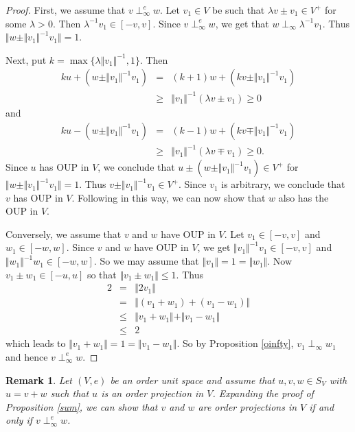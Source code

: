 \documentclass[12pt]{amsart}
\newtheorem{remark}[theorem]{Remark}
\begin{document}
\begin{proof}
	First, we assume that $v \perp_{\infty}^e w$. Let $v_1 \in V$ be such that $\lambda v \pm v_1 \in V^+$ for some $\lambda > 0$. Then $\lambda^{-1} v_1 \in [- v, v]$. Since $v \perp_{\infty}^e w$, we get that $w \perp_{\infty} \lambda^{-1} v_1$. Thus $\Vert w \pm \Vert v_1 \Vert^{-1} v_1 \Vert = 1$. 
	
	Next, put $k = \max \lbrace \lambda \Vert v_1 \Vert^{-1}, 1 \rbrace$. Then 
	\begin{eqnarray*}
		k u + (w \pm \Vert v_1 \Vert^{-1} v_1) &=& (k + 1) w + (k v \pm \Vert v_1 \Vert^{-1} v_1) \\ 
		&\ge& \Vert v_1 \Vert^{-1} (\lambda v \pm v_1) \ge 0
	\end{eqnarray*} 
	and 
	\begin{eqnarray*}
		k u - (w \pm \Vert v_1 \Vert^{-1} v_1) &=& (k - 1) w + (k v \mp \Vert v_1 \Vert^{-1} v_1) \\ 
		&\ge& \Vert v_1 \Vert^{-1} (\lambda v \mp v_1) \ge 0.
	\end{eqnarray*} 
	Since $u$ has OUP in $V$, we conclude that $u \pm (w \pm \Vert v_1 \Vert^{-1} v_1) \in V^+$ for $\Vert w \pm \Vert v_1 \Vert^{-1} v_1 \Vert = 1$. Thus $v \pm \Vert v_1 \Vert^{-1} v_1 \in V^+$. Since $v_1$ is arbitrary, we conclude that $v$ has OUP in $V$. Following in this way, we can now show that $w$ also has the OUP in $V$. 
	
	Conversely, we assume that $v$ and $w$ have OUP in $V$. Let $v_1 \in [- v, v]$ and $w_1 \in [- w, w]$. Since $v$ and $w$ have OUP in $V$, we get $\Vert v_1 \Vert^{-1} v_1 \in [- v, v]$ and $\Vert w_1 \Vert^{-1} w_1 \in [- w, w]$. So we may assume that $\Vert v_1 \Vert = 1 = \Vert w_1 \Vert$. Now $v_1 \pm w_1 \in [- u, u]$ so that $\Vert v_1 \pm w_1 \Vert \le 1$. Thus 
	\begin{eqnarray*}
		2 &=& \Vert 2 v_1 \Vert \\ 
		&=& \Vert (v_1 + w_1) + (v_1 - w_1) \Vert \\ 
		&\le& \Vert v_1 + w_1 \Vert + \Vert v_1 - w_1 \Vert \\ 
		&\le& 2
	\end{eqnarray*} 
	which leads to $\Vert v_1 + w_1 \Vert = 1 = \Vert v_1 - w_1 \Vert$. So by Proposition \ref{oinfty}, $v_1 \perp_{\infty} w_1$ and hence $v \perp_{\infty}^e w$. 
\end{proof}
\begin{remark}
	Let $(V, e)$ be an order unit space and assume that $u, v, w \in S_V$ with $u = v + w$ such that $u$ is an order projection in $V$. Expanding the proof of Proposition \ref{sum}, we can show that $v$ and $w$ are order projections in $V$ if and only if $v \perp_{\infty}^e w$.
\end{remark}
\end{document}
